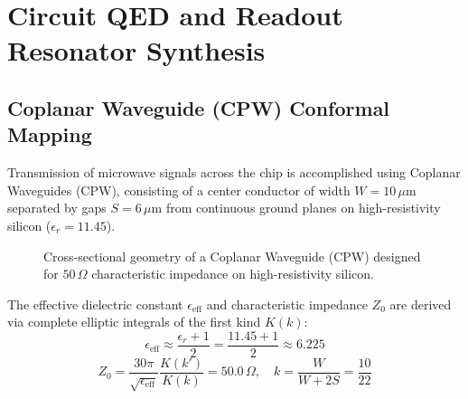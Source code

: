 \documentclass[10pt,journal,compsoc]{IEEEtran}
\begin{document}
\section{Circuit QED and Readout Resonator Synthesis}

\subsection{Coplanar Waveguide (CPW) Conformal Mapping}
Transmission of microwave signals across the chip is accomplished using Coplanar Waveguides (CPW), consisting of a center conductor of width $W = 10\,\mu\text{m}$ separated by gaps $S = 6\,\mu\text{m}$ from continuous ground planes on high-resistivity silicon ($\epsilon_r = 11.45$).

\begin{figure}[!t]
\centering
{}
\caption{Cross-sectional geometry of a Coplanar Waveguide (CPW) designed for $50\,\Omega$ characteristic impedance on high-resistivity silicon.}
\label{fig:cpw}
\end{figure}

The effective dielectric constant $\epsilon_{\text{eff}}$ and characteristic impedance $Z_0$ are derived via complete elliptic integrals of the first kind $K(k)$:
\begin{equation}
\epsilon_{\text{eff}} \approx \frac{\epsilon_r + 1}{2} = \frac{11.45 + 1}{2} \approx 6.225
\end{equation}
\begin{equation}
Z_0 = \frac{30\pi}{\sqrt{\epsilon_{\text{eff}}}} \frac{K(k')}{K(k)} = 50.0\,\Omega, \quad k = \frac{W}{W + 2S} = \frac{10}{22}
\end{equation}
\end{document}
